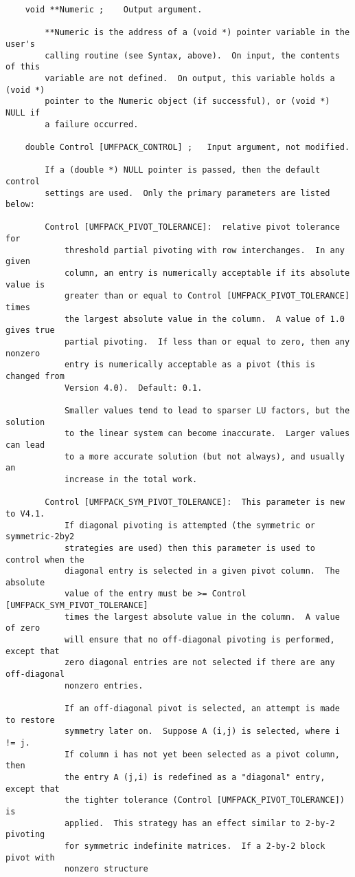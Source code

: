 \documentclass[11pt]{article}
\begin{document}
{\begin{verbatim}
    void **Numeric ;    Output argument.

        **Numeric is the address of a (void *) pointer variable in the user's
        calling routine (see Syntax, above).  On input, the contents of this
        variable are not defined.  On output, this variable holds a (void *)
        pointer to the Numeric object (if successful), or (void *) NULL if
        a failure occurred.

    double Control [UMFPACK_CONTROL] ;   Input argument, not modified.

        If a (double *) NULL pointer is passed, then the default control
        settings are used.  Only the primary parameters are listed below:

        Control [UMFPACK_PIVOT_TOLERANCE]:  relative pivot tolerance for
            threshold partial pivoting with row interchanges.  In any given
            column, an entry is numerically acceptable if its absolute value is
            greater than or equal to Control [UMFPACK_PIVOT_TOLERANCE] times
            the largest absolute value in the column.  A value of 1.0 gives true
            partial pivoting.  If less than or equal to zero, then any nonzero
            entry is numerically acceptable as a pivot (this is changed from
            Version 4.0).  Default: 0.1.

            Smaller values tend to lead to sparser LU factors, but the solution
            to the linear system can become inaccurate.  Larger values can lead
            to a more accurate solution (but not always), and usually an
            increase in the total work.

        Control [UMFPACK_SYM_PIVOT_TOLERANCE]:  This parameter is new to V4.1.
            If diagonal pivoting is attempted (the symmetric or symmetric-2by2
            strategies are used) then this parameter is used to control when the
            diagonal entry is selected in a given pivot column.  The absolute
            value of the entry must be >= Control [UMFPACK_SYM_PIVOT_TOLERANCE]
            times the largest absolute value in the column.  A value of zero
            will ensure that no off-diagonal pivoting is performed, except that
            zero diagonal entries are not selected if there are any off-diagonal
            nonzero entries.

            If an off-diagonal pivot is selected, an attempt is made to restore
            symmetry later on.  Suppose A (i,j) is selected, where i != j.
            If column i has not yet been selected as a pivot column, then
            the entry A (j,i) is redefined as a "diagonal" entry, except that
            the tighter tolerance (Control [UMFPACK_PIVOT_TOLERANCE]) is
            applied.  This strategy has an effect similar to 2-by-2 pivoting
            for symmetric indefinite matrices.  If a 2-by-2 block pivot with
            nonzero structure


\end{verbatim}}
\end{document}
